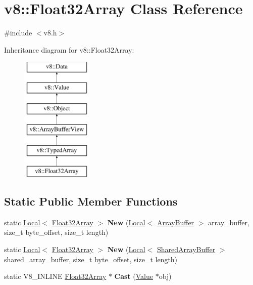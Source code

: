 \hypertarget{classv8_1_1Float32Array}{}\section{v8\+:\+:Float32\+Array Class Reference}
\label{classv8_1_1Float32Array}


{\ttfamily \#include $<$v8.\+h$>$}

Inheritance diagram for v8\+:\+:Float32\+Array\+:\begin{figure}[H]
\begin{center}
\leavevmode
\includegraphics[height=6.000000cm]{classv8_1_1Float32Array}
\end{center}
\end{figure}
\subsection*{Static Public Member Functions}
\begin{DoxyCompactItemize}
\item 
static \hyperlink{classv8_1_1Local}{Local}$<$ \hyperlink{classv8_1_1Float32Array}{Float32\+Array} $>$ {\bfseries New} (\hyperlink{classv8_1_1Local}{Local}$<$ \hyperlink{classv8_1_1ArrayBuffer}{Array\+Buffer} $>$ array\+\_\+buffer, size\+\_\+t byte\+\_\+offset, size\+\_\+t length)\hypertarget{classv8_1_1Float32Array_af7e2ce97268849289d8ab38fd07fbf62}{}\label{classv8_1_1Float32Array_af7e2ce97268849289d8ab38fd07fbf62}

\item 
static \hyperlink{classv8_1_1Local}{Local}$<$ \hyperlink{classv8_1_1Float32Array}{Float32\+Array} $>$ {\bfseries New} (\hyperlink{classv8_1_1Local}{Local}$<$ \hyperlink{classv8_1_1SharedArrayBuffer}{Shared\+Array\+Buffer} $>$ shared\+\_\+array\+\_\+buffer, size\+\_\+t byte\+\_\+offset, size\+\_\+t length)\hypertarget{classv8_1_1Float32Array_af3140edf1f13845670f4e4ddd41200c3}{}\label{classv8_1_1Float32Array_af3140edf1f13845670f4e4ddd41200c3}

\item 
static V8\+\_\+\+I\+N\+L\+I\+NE \hyperlink{classv8_1_1Float32Array}{Float32\+Array} $\ast$ {\bfseries Cast} (\hyperlink{classv8_1_1Value}{Value} $\ast$obj)\hypertarget{classv8_1_1Float32Array_adf926d03cacd4b3901d7f9750671a350}{}\label{classv8_1_1Float32Array_adf926d03cacd4b3901d7f9750671a350}

\end{DoxyCompactItemize}
